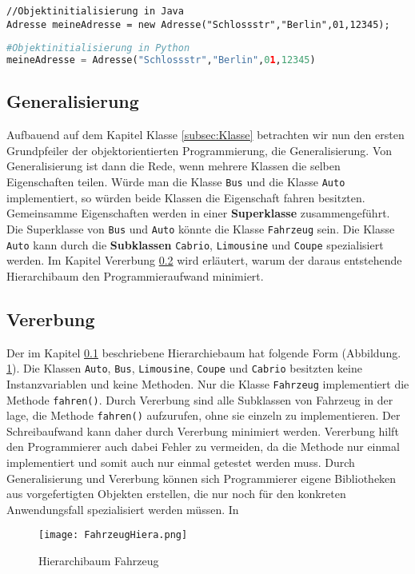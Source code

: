 \begin{lstlisting}[caption=Objektinitialisierung in Java, label=Konstruktor Java]
//Objektinitialisierung in Java
Adresse meineAdresse = new Adresse("Schlossstr","Berlin",01,12345);
\end{lstlisting}

\begin{lstlisting}[caption= Objektinitialisierung in Python, label=ObjektinitialisierungPython,language=Python]
#Objektinitialisierung in Python
meineAdresse = Adresse("Schlossstr","Berlin",01,12345)
\end{lstlisting}

\subsection{Generalisierung} \label{subsec:Generalisierung}
Aufbauend auf dem Kapitel Klasse \ref{subsec:Klasse} betrachten wir nun den ersten Grundpfeiler der objektorientierten Programmierung, die Generalisierung. Von Generalisierung ist dann die Rede, wenn mehrere Klassen die selben Eigenschaften teilen. Würde man die Klasse \texttt{Bus} und die Klasse \texttt{Auto} implementiert, so würden beide Klassen die Eigenschaft fahren besitzten. Gemeinsamme Eigenschaften werden in einer \textbf{Superklasse} zusammengeführt. Die Superklasse von \texttt{Bus} und \texttt{Auto} könnte die Klasse \texttt{Fahrzeug} sein. Die Klasse \texttt{Auto} kann durch die \textbf{Subklassen} \texttt{Cabrio}, \texttt{Limousine} und \texttt{Coupe} spezialisiert werden. Im Kapitel Vererbung \ref{subsec:Vererbung} wird erläutert, warum der daraus entstehende Hierarchibaum den Programmieraufwand minimiert. 


\subsection{Vererbung} \label{subsec:Vererbung}

Der im Kapitel \ref{subsec:Generalisierung} beschriebene Hierarchiebaum hat folgende Form (Abbildung. \ref{img:Hierarchiebaum}). Die Klassen \texttt{Auto}, \texttt{Bus}, \texttt{Limousine}, \texttt{Coupe} und \texttt{Cabrio} besitzten keine Instanzvariablen und keine Methoden. Nur die Klasse \texttt{Fahrzeug} implementiert die Methode \texttt{fahren()}.
Durch Vererbung sind alle Subklassen von Fahrzeug in der lage, die Methode \texttt{fahren()} aufzurufen, ohne sie einzeln zu implementieren. Der Schreibaufwand kann daher durch Vererbung minimiert werden. Vererbung hilft den Programmierer auch dabei Fehler zu vermeiden, da die Methode nur einmal implementiert und somit auch nur einmal getestet werden muss. Durch Generalisierung und Vererbung können sich Programmierer eigene Bibliotheken aus vorgefertigten Objekten  erstellen, die nur noch für den konkreten Anwendungsfall spezialisiert werden müssen. In 
\begin{figure}[!htb]
\centering
\texttt{[image: FahrzeugHiera.png]}%
\caption{Hierarchibaum Fahrzeug}
\label{img:Hierarchiebaum}
\end{figure}

